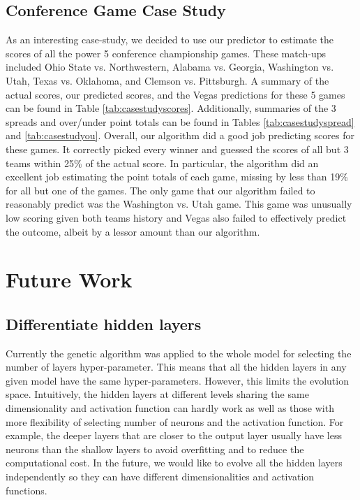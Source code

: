 \documentclass[10pt,twocolumn,letterpaper]{article}
\begin{document}
\subsection{Conference Game Case Study}
As an interesting case-study, we decided to use our predictor to estimate the scores of all the power 5 conference championship games. These match-ups included Ohio State vs. Northwestern, Alabama vs. Georgia, Washington vs. Utah, Texas vs. Oklahoma, and Clemson vs. Pittsburgh. A summary of the actual scores, our predicted scores, and the Vegas predictions for these 5 games can be found in Table \ref{tab:casestudyscores}. Additionally, summaries of the 3 spreads and over/under point totals can be found in Tables \ref{tab:casestudyspread} and \ref{tab:casestudyou}. Overall, our algorithm did a good job predicting scores for these games. It correctly picked every winner and guessed the scores of all but 3 teams within 25\% of the actual score. In particular, the algorithm did an excellent job estimating the point totals of each game, missing by less than 19\% for all but one of the games. The only game that our algorithm failed to reasonably predict was the Washington vs. Utah game. This game was unusually low scoring given both teams history and Vegas also failed to effectively predict the outcome, albeit by a lessor amount than our algorithm.


\section{Future Work}
\subsection{Differentiate hidden layers}
Currently the genetic algorithm was applied to the whole model for selecting the number of layers hyper-parameter. This means that all the hidden layers in any given model have the same hyper-parameters. However, this limits the evolution space.  Intuitively, the hidden layers at different levels sharing the same dimensionality and activation function can hardly work as well as those with more flexibility of selecting number of neurons and the activation function. For example, the deeper layers that are closer to the output layer usually have less neurons than the shallow layers to avoid overfitting and to reduce the computational cost. In the future, we would like to evolve all the hidden layers independently so they can have different dimensionalities and activation functions.
\end{document}
